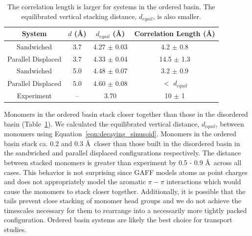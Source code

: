 \documentclass[journal=jpcbfk,manuscript=article]{achemso}
\begin{document}
  \begin{table}[h]
  \centering
  \begin{tabular}{cccc}
  \toprule
  System             & $\mathit{d}$ (\AA) & $\mathit{d}_{equil}$ (\AA) & Correlation Length (\AA) \\
  \midrule
  Sandwiched         & 3.7                &    4.27 $\pm$ 0.03         & 4.2 $\pm$ 0.8            \\
  Parallel Displaced & 3.7                &    4.33 $\pm$ 0.04         & 14.5 $\pm$ 1.3           \\ 
  Sandwiched         & 5.0                &    4.48 $\pm$ 0.07         & 3.2 $\pm$ 0.9            \\
  Parallel Displaced & 5.0                &    4.60 $\pm$ 0.08         & $<$ $d_{equil}$ \\ 
  Experiment         & --                 &    3.70                    & 10 $\pm$ 1               \\
  \bottomrule
  \end{tabular}
  \caption{The correlation length is larger for systems in the ordered basin. The equilibrated vertical
  stacking distance, $\mathit{d}_{equil}$, is also smaller.}
  \label{table:correlation_length}
  \end{table}

  Monomers in the ordered basin stack closer together than those in the disordered basin
  (Table~\ref{table:correlation_length}). We calculated the equilibrated vertical distance,
  $\mathit{d}_{equil}$, between monomers using Equation~\ref{eqn:decaying_sinusoid}. 
  Monomers in the ordered basin stack ca. 0.2 and 0.3 \AA~closer than those built in the 
  disordered basin in the sandwiched and parallel displaced configurations respectively. 
  The distance between stacked monomers is greater than experiment by 0.5 - 0.9 \AA~across all 
  cases. This behavior is not surprising since GAFF models atoms as point charges and does not 
  appropriately model the aromatic $\pi-\pi$ interactions which would cause the monomers to 
  stack closer together. Additionally, it is possible that the tails prevent close stacking of
  monomer head groups and we do not achieve the timescales necessary for them to rearrange into
  a necessarily more tightly packed configuration. Ordered basin systems are likely the best 
  choice for transport studies. 
  
  
\end{document}
